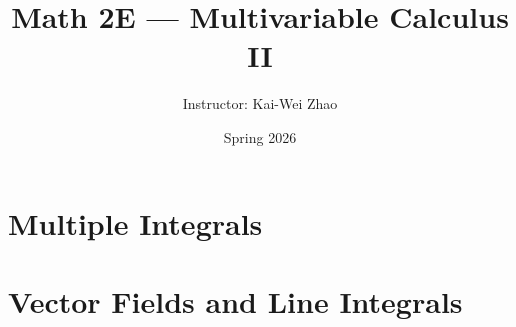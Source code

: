 \documentclass[11pt]{article}
\title{Math 2E --- Multivariable Calculus II}
\author{Instructor: Kai-Wei Zhao}
\date{Spring 2026}
\begin{document}
\maketitle
\tableofcontents
\newpage

\section{Multiple Integrals}


\section{Vector Fields and Line Integrals}

\end{document}
